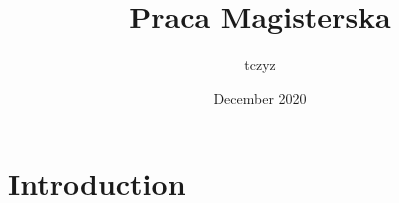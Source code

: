 \documentclass{article}
\title{Praca Magisterska}
\author{tczyz }
\date{December 2020}
\begin{document}
\maketitle

\section{Introduction}
\end{document}
